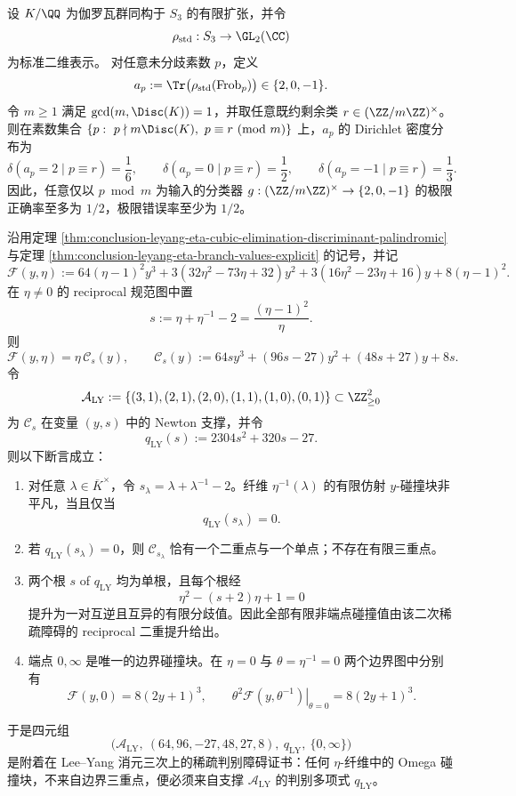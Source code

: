 \begin{theorem}\label{thm:conclusion-leyang-s3-artin-trace-congruence-blindness}
设 \(K/\QQ\) 为伽罗瓦群同构于 \(S_3\) 的有限扩张，并令
\[
\rho_{\mathrm{std}}:S_3\to \GL_2(\CC)
\]
为标准二维表示。
对任意未分歧素数 \(p\)，定义
\[
a_p:=\Tr\bigl(\rho_{\mathrm{std}}(\mathrm{Frob}_p)\bigr)\in\{2,0,-1\}.
\]
令 \(m\ge 1\) 满足 \(\gcd(m,\Disc(K))=1\)，并取任意既约剩余类 \(r\in(\ZZ/m\ZZ)^\times\)。
则在素数集合 \(\{p:\ p\nmid m\Disc(K),\ p\equiv r\ (\mathrm{mod}\ m)\}\) 上，\(a_p\) 的 Dirichlet 密度分布为
\[
\delta(a_p=2\mid p\equiv r)=\frac16,\qquad
\delta(a_p=0\mid p\equiv r)=\frac12,\qquad
\delta(a_p=-1\mid p\equiv r)=\frac13.
\]
因此，任意仅以 \(p\bmod m\) 为输入的分类器 \(g:(\ZZ/m\ZZ)^\times\to\{2,0,-1\}\) 的极限正确率至多为 \(1/2\)，极限错误率至少为 \(1/2\)。
\end{theorem}
\begin{theorem}\label{distill:khovanskii_newton_polyhedra_fewnomials_and_tropical_skeletons-sparse_discriminant_obstruction-leyang-reciprocal-sparse-discriminant-collision-skeleton}
沿用定理 \ref{thm:conclusion-leyang-eta-cubic-elimination-discriminant-palindromic} 与定理 \ref{thm:conclusion-leyang-eta-branch-values-explicit} 的记号，并记
\[
\mathcal F(y,\eta):=
64(\eta-1)^2y^3
+3(32\eta^2-73\eta+32)y^2
+3(16\eta^2-23\eta+16)y
+8(\eta-1)^2 .
\]
在 \(\eta\neq0\) 的 reciprocal 规范图中置
\[
s:=\eta+\eta^{-1}-2=\frac{(\eta-1)^2}{\eta}.
\]
则
\[
\mathcal F(y,\eta)=\eta\,\mathcal C_s(y),
\qquad
\mathcal C_s(y):=64sy^3+(96s-27)y^2+(48s+27)y+8s.
\]
令
\[
\mathcal A_{\mathrm{LY}}
:=\{(3,1),(2,1),(2,0),(1,1),(1,0),(0,1)\}\subset\ZZ_{\ge0}^2
\]
为 \(\mathcal C_s\) 在变量 \((y,s)\) 中的 Newton 支撑，并令
\[
q_{\mathrm{LY}}(s):=2304s^2+320s-27.
\]
则以下断言成立：
\begin{enumerate}
  \item 对任意 \(\lambda\in\overline K^{\times}\)，令 \(s_\lambda=\lambda+\lambda^{-1}-2\)。纤维 \(\eta^{-1}(\lambda)\) 的有限仿射 \(y\)-碰撞块非平凡，当且仅当
  \[
  q_{\mathrm{LY}}(s_\lambda)=0.
  \]
  \item 若 \(q_{\mathrm{LY}}(s_\lambda)=0\)，则 \(\mathcal C_{s_\lambda}\) 恰有一个二重点与一个单点；不存在有限三重点。
  \item 两个根 \(s\) of \(q_{\mathrm{LY}}\) 均为单根，且每个根经
  \[
  \eta^2-(s+2)\eta+1=0
  \]
  提升为一对互逆且互异的有限分歧值。因此全部有限非端点碰撞值由该二次稀疏障碍的 reciprocal 二重提升给出。
  \item 端点 \(0,\infty\) 是唯一的边界碰撞块。在 \(\eta=0\) 与 \(\theta=\eta^{-1}=0\) 两个边界图中分别有
  \[
  \mathcal F(y,0)=8(2y+1)^3,
  \qquad
  \left.\theta^2\mathcal F(y,\theta^{-1})\right|_{\theta=0}=8(2y+1)^3.
  \]
\end{enumerate}
于是四元组
\[
\bigl(\mathcal A_{\mathrm{LY}},\ (64,96,-27,48,27,8),\ q_{\mathrm{LY}},\ \{0,\infty\}\bigr)
\]
是附着在 Lee--Yang 消元三次上的稀疏判别障碍证书：任何 \(\eta\)-纤维中的 Omega 碰撞块，不来自边界三重点，便必须来自支撑 \(\mathcal A_{\mathrm{LY}}\) 的判别多项式 \(q_{\mathrm{LY}}\)。
\end{theorem}
